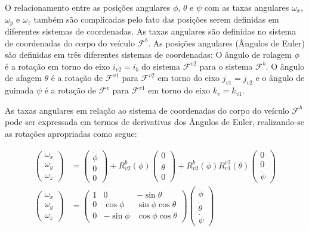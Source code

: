 \documentclass[a4paper, 12pt]{article}
\begin{document}
O relacionamento entre as posições angulares $\phi$, $\theta$ e $\psi$ com as taxas angulares $\omega_x$, $\omega_y$ e $\omega_z$ também são complicadas pelo fato das posições serem definidas em diferentes sistemas de coordenadas. As taxas angulares são definidas no sistema de coordenadas do corpo do veículo $\mathcal{F}^{b}$. As posições angulares (Ângulos de Euler) são definidas em três diferentes sistemas de coordenadas: O ângulo de rolagem $\phi$ é a rotação em torno do eixo $i_{v2} = i_{b}$ do sistema $\mathcal{F}^{v2}$ para o sistema $\mathcal{F}^{b}$. O ângulo de afagem $\theta$ é a rotação de $\mathcal{F}^{v1}$ para $\mathcal{F}^{v2}$ em torno do eixo $j_{v1} = j_{v2}$ e o ângulo de guinada $\psi$ é a rotação de $\mathcal{F}^{v}$ para $\mathcal{F}^{v1}$ em torno do eixo $k_v = k_{v1}$.

As taxas angulares em relação ao sistema de coordenadas do corpo do veículo $\mathcal{F}^{b}$ pode ser expressada em termos de derivativas dos Ângulos de Euler, realizando-se as rotações apropriadas como segue:

\begin{equation}
\begin{aligned}
\begin{pmatrix} 
	{ \omega }_{ x } \\ { \omega }_{ y } \\ { \omega}_{ z } 
\end{pmatrix} &= 
\begin{pmatrix} 
	{\dot{\phi}} \\  0 \\ 0 
\end{pmatrix} + 
{ R }_{ v2 }^{ b }(\phi)
\begin{pmatrix} 
 0 \\  {\dot{\theta}} \\ 0 
\end{pmatrix} +
{ R }_{ v2 }^{ b }(\phi){ R }_{ v1 }^{ v2 }(\theta)
\begin{pmatrix} 
0 \\  0 \\ {\dot{\psi}} 
\end{pmatrix} \\
\begin{pmatrix} 
	{ \omega  }_{ x } \\ { \omega  }_{ y } \\ { \omega  }_{ z }
\end{pmatrix} &= 
\begin{pmatrix} 
	1 & 0 & -\sin { \theta  }  \\ 
	0 & \cos { \phi  }  & \sin { \phi \cos { \theta  }  }  \\ 
	0 & -\sin { \phi  }  & \cos { \phi \cos { \theta  }  } 
\end{pmatrix}
\begin{pmatrix} 
	{\dot {\phi}} \\ { \dot {\theta}} \\ { \dot { \psi}} 
\end{pmatrix}
\end{aligned}
\label{eq:cin2}
\end{equation}
\end{document}
